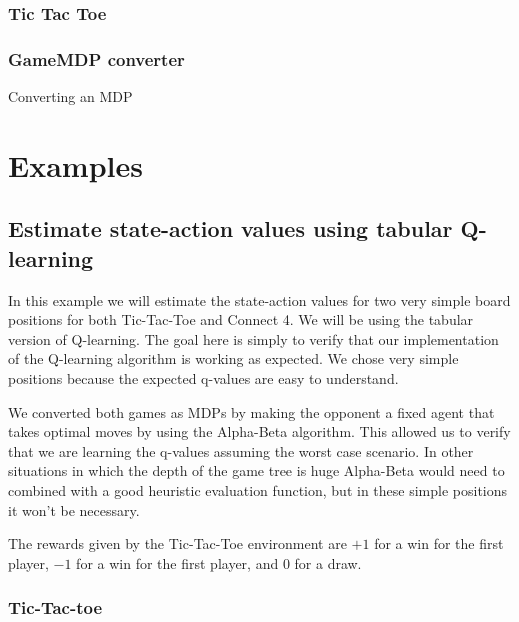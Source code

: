 \documentclass{article}
\newcommand{\GithubURL}[1]{[\href{https://github.com/davidrobles/mlnd-capstone-code/blob/master/#1}{source}]}
\begin{document}
\subsubsection{Tic Tac Toe}


\subsubsection{GameMDP converter}

Converting an MDP

\section{Examples}

\subsection{Estimate state-action values using tabular Q-learning}

In this example we will estimate the state-action values for two very simple board positions for
both Tic-Tac-Toe and Connect 4. We will be using the tabular version of Q-learning. The goal here is
simply to verify that our implementation of the Q-learning algorithm is working as expected. We
chose very simple positions because the expected q-values are easy to understand.

We converted both games as MDPs by making the opponent a fixed agent that takes optimal moves by
using the Alpha-Beta algorithm. This allowed us to verify that we are learning the q-values assuming
the worst case scenario. In other situations in which the depth of the game tree is huge Alpha-Beta
would need to combined with a good heuristic evaluation function, but in these simple positions it
won't be necessary.

The rewards given by the Tic-Tac-Toe environment are $+1$ for a win for the first player, $-1$ for a
win for the first player, and $0$ for a draw.

\subsubsection{Tic-Tac-toe}
\end{document}
